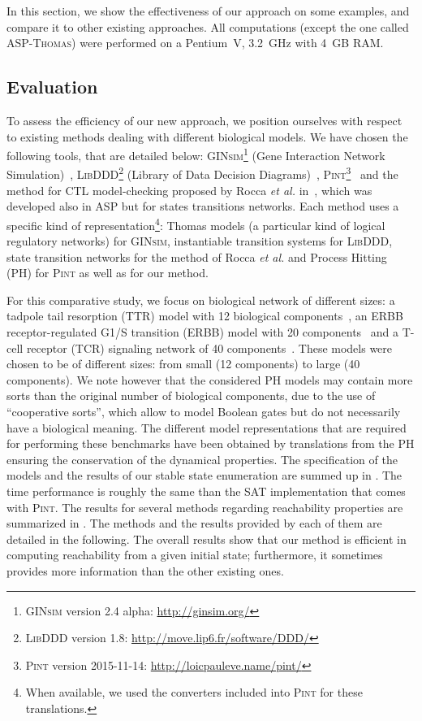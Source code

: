 In this section, we show the effectiveness of our approach on some examples,
and compare it to other existing approaches.
All computations (except the one called \textsc{ASP-Thomas}) were performed on a Pentium~V, 3.2~GHz with 4~GB RAM.

\subsection{Evaluation}
To assess the efficiency of our new approach,
we position ourselves with respect to existing methods dealing with different biological models.
We have chosen the following tools, that are detailed below: 
\textsc{GINsim}\footnote{\textsc{GINsim} version 2.4 alpha: \url{http://ginsim.org/}} (Gene Interaction Network Simulation)~\cite{gonzalez2006ginsim,naldi2009logical,naldi2007decision},
\textsc{LibDDD}\footnote{\textsc{LibDDD} version 1.8: \url{http://move.lip6.fr/software/DDD/}}
(Library of Data Decision Diagrams)~\cite{thierry2009hierarchical,colange2013towards},
\textsc{Pint}\footnote{\textsc{Pint} version 2015-11-14: \url{http://loicpauleve.name/pint/}}~\cite{PMR12-MSCS}
and the method for CTL model-checking proposed by Rocca \textit{et al.} in~\cite{roccaasp},
which was developed also in ASP but for states transitions networks.
Each method uses a specific kind of representation\footnote{When available, we used the converters included into \textsc{Pint} for these translations.}:
Thomas models (a particular kind of logical regulatory networks) for \textsc{GINsim},
instantiable transition systems for \textsc{LibDDD},
state transition networks for the method of Rocca \textit{et al.}
and Process Hitting (PH) for \textsc{Pint} as well as for our method.

For this comparative study, we focus on biological network of different sizes:
a tadpole tail resorption (TTR) model with 12 biological components~\cite{khalis2009smbionet},
an ERBB receptor-regulated G1/S transition (ERBB) model with 20 components~\cite{Samaga2009}
and a T-cell receptor (TCR) signaling network of 40 components~\cite{Klamt06}.
These models were chosen to be of different sizes:
from small (12 components) to large (40 components).
We note however that the considered PH models may contain more sorts than
the original number of biological components, due to the use of
``cooperative sorts'', which allow to model Boolean gates but do not necessarily
have a biological meaning.
The different model representations that are required for performing these benchmarks have been obtained by translations
from the PH
ensuring the conservation of the dynamical properties.
The specification of the models and the results of our stable state enumeration
are summed up in .
The time performance is roughly the same than the SAT implementation
that comes with \textsc{Pint}.
The results for several methods regarding reachability properties
are summarized in .
The methods and the results provided by each of them are detailed in the following.
The overall results show that our method is efficient in computing reachability
from a given initial state;
furthermore, it sometimes provides more information than the other existing ones.

